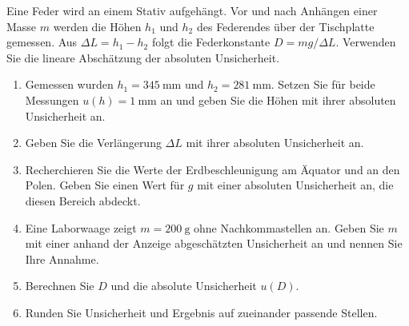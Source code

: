 \begin{ExerciseBlock}
Eine Feder wird an einem Stativ aufgehängt. Vor und nach Anhängen einer Masse $m$ werden die Höhen $h_1$ und $h_2$ des Federendes über der Tischplatte gemessen. Aus $\Delta L=h_1-h_2$ folgt die Federkonstante $D=mg/\Delta L$. Verwenden Sie die lineare Abschätzung der absoluten Unsicherheit.
\begin{enumerate}
\item Gemessen wurden $h_1=\qty{345}{\milli\metre}$ und $h_2=\qty{281}{\milli\metre}$. Setzen Sie für beide Messungen $u(h)=\qty{1}{\milli\metre}$ an und geben Sie die Höhen mit ihrer absoluten Unsicherheit an.
\item Geben Sie die Verlängerung $\Delta L$ mit ihrer absoluten Unsicherheit an.
\item Recherchieren Sie die Werte der Erdbeschleunigung am Äquator und an den Polen. Geben Sie einen Wert für $g$ mit einer absoluten Unsicherheit an, die diesen Bereich abdeckt.
\item Eine Laborwaage zeigt $m=\qty{200}{\gram}$ ohne Nachkommastellen an. Geben Sie $m$ mit einer anhand der Anzeige abgeschätzten Unsicherheit an und nennen Sie Ihre Annahme.
\item Berechnen Sie $D$ und die absolute Unsicherheit $u(D)$.
\item Runden Sie Unsicherheit und Ergebnis auf zueinander passende Stellen.
\end{enumerate}
\end{ExerciseBlock}
